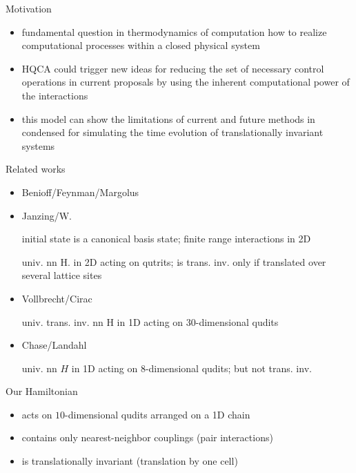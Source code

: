 \documentclass[slideColor]{prosper}
\renewcommand{\>}{\rangle}
\newcommand{\<}{\langle}
\begin{document}
\begin{slide}{Motivation}
\begin{itemize}
\item fundamental question in thermodynamics of computation how to realize computational processes within a closed physical system

\medskip
\item HQCA could trigger new ideas for reducing the set of necessary control operations in current proposals by using the inherent computational power of the interactions

\medskip
\item this model can show the limitations of current and future methods in condensed for simulating the time evolution of translationally invariant systems
\end{itemize}
\end{slide}


\begin{slide}{Related works}

\begin{itemize}
\item Benioff/Feynman/Margolus

\medskip
\item Janzing/W. 

initial state is a canonical basis state; finite range interactions in 2D

\medskip
univ. nn H. in 2D acting on qutrits; is trans. inv. only if translated over several lattice sites

\medskip
\item Vollbrecht/Cirac

univ. trans. inv. nn H in 1D acting on $30$-dimensional qudits

\medskip
\item Chase/Landahl

univ. nn $H$ in 1D acting on $8$-dimensional qudits; but not trans. inv.
\end{itemize}

\end{slide}


\begin{slide}{Our Hamiltonian}

\begin{itemize}
\item acts on $10$-dimensional qudits arranged on a 1D chain

\medskip
\item contains only nearest-neighbor couplings (pair interactions)

\medskip
\item is translationally invariant (translation by one cell)
\end{itemize}

\end{slide}
\end{document}
